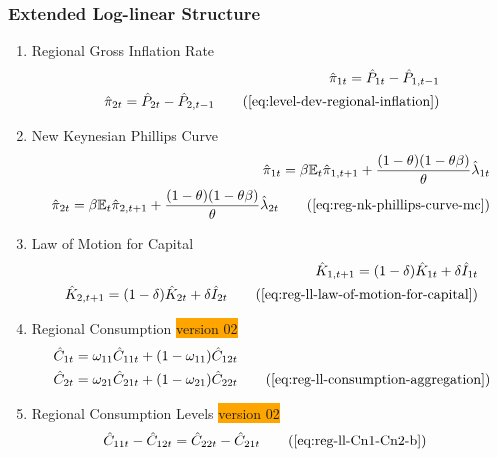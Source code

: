 \documentclass[../thesis.tex]{subfiles}
\begin{document}
{\singlespacing
	
	\subsubsection{Extended Log-linear Structure}
	
	\begin{enumerate}
		
		\item Regional Gross Inflation Rate
		\begin{align}
			\hat{\pi}_{1 t} = \hat{P}_{1 t} - \hat{P}_{1, t-1} \nonumber \\
			\hat{\pi}_{2 t} = \hat{P}_{2 t} - \hat{P}_{2, t-1} \tag{\ref{eq:level-dev-regional-inflation}}
		\end{align}
		
		\item New Keynesian Phillips Curve
		\begin{align}
			\hat{\pi}_{1 t} = \beta \E \hat{\pi}_{1, t+1} + \frac{(1-\theta) (1- \theta \beta)}{\theta} \hat{\lambda}_{1 t} \nonumber \\
			\hat{\pi}_{2 t} = \beta \E \hat{\pi}_{2, t+1} + \frac{(1-\theta) (1- \theta \beta)}{\theta} \hat{\lambda}_{2 t} \tag{\ref{eq:reg-nk-phillips-curve-mc}}
		\end{align}
		
		\item Law of Motion for Capital
		\begin{alignat}{2}
			\hat{K}_{1, t+1} = (1-\delta) \hat{K}_{1 t} + \delta \hat{I}_{1 t} \nonumber \\
			\hat{K}_{2, t+1} = (1-\delta) \hat{K}_{2 t} + \delta \hat{I}_{2 t} \tag{\ref{eq:reg-ll-law-of-motion-for-capital}} 
		\end{alignat}


		\item Regional Consumption \colorbox{orange}{version 02}
		\begin{align}
			\hat{C}_{1t} &= \omega_{11} \hat{C}_{11t} + (1-\omega_{11}) \hat{C}_{12t} \nonumber \\ 
			\hat{C}_{2t} &= \omega_{21} \hat{C}_{21t} + (1-\omega_{21}) \hat{C}_{22t} \tag{\ref{eq:reg-ll-consumption-aggregation}}
		\end{align}
		
		\item Regional Consumption Levels \colorbox{orange}{version 02}
		\begin{align}
			\hat{C}_{11t} - \hat{C}_{12t} &= \hat{C}_{22t} - \hat{C}_{21t} \tag{\ref{eq:reg-ll-Cn1-Cn2-b}}
		\end{align}


\end{enumerate}}
\end{document}
